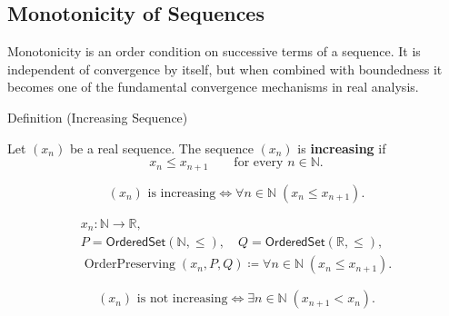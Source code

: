 \subsection*{Monotonicity of Sequences}

\begin{exposition}
Monotonicity is an order condition on successive terms of a sequence. It is
independent of convergence by itself, but when combined with boundedness it
becomes one of the fundamental convergence mechanisms in real analysis.
\end{exposition}


\begin{definitionbox}{Definition (Increasing Sequence)}
\begin{definition}
\label{def:increasing-sequence}
Let $(x_n)$ be a real sequence. The sequence $(x_n)$ is
\textbf{increasing} if
\[
  x_n \le x_{n+1}
  \qquad
  \text{for every } n\in\mathbb{N}.
\]
\end{definition}
\end{definitionbox}

\begin{remark*}
\[
(x_n)\text{ is increasing}
\Longleftrightarrow
\forall n\in\mathbb{N}\;(x_n\le x_{n+1}).
\]
\end{remark*}

\begin{remark*}
\[
\begin{gathered}
x_n\colon\mathbb{N}\to\mathbb{R},\\
P=\mathsf{OrderedSet}(\mathbb{N},\leq),\quad
Q=\mathsf{OrderedSet}(\mathbb{R},\leq),\\
\operatorname{OrderPreserving}(x_n,P,Q)
\coloneqq
\forall n\in\mathbb{N}\;(x_n\le x_{n+1}).
\end{gathered}
\]
\end{remark*}

\begin{remark*}
\[
(x_n)\text{ is not increasing}
\Longleftrightarrow
\exists n\in\mathbb{N}\;(x_{n+1}<x_n).
\]
\end{remark*}

